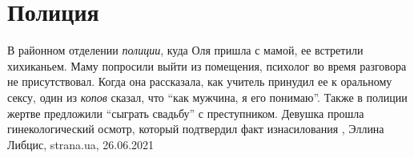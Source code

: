  
 
 
 
 
\chapter{Полиция}
\label{sec:slova.policia}

В районном отделении \emph{полиции}, куда Оля пришла с мамой, ее встретили хихиканьем.
Маму попросили выйти из помещения, психолог во время разговора не
присутствовал. Когда она рассказала, как учитель принудил ее к оральному сексу,
один из \emph{копов} сказал, что \enquote{как мужчина, я его понимаю}. Также в полиции жертве
предложили \enquote{сыграть свадьбу} с преступником.  Девушка прошла гинекологический
осмотр, который подтвердил факт изнасилования
, Эллина Либцис, strana.ua, 26.06.2021

